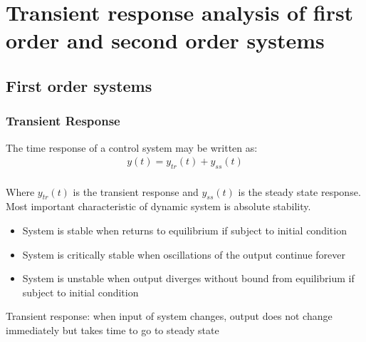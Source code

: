\section{Transient response analysis of first order and
second order systems}

\subsection{First order systems}

\begin{frame}
\frametitle{Transient Response}
The time response of a control system may be written as:
\begin{align*}
y(t) = y_{tr}(t) + y_{ss}(t)
\end {align*}
\\Where $y_{tr}(t)$ is the transient response and $y_{ss}(t)$ is the steady state response.
Most important characteristic of dynamic system is absolute stability.
\pause
\begin{itemize}
\item System is stable when returns to equilibrium if subject to initial condition
\item System is critically stable when oscillations of the output continue forever
\item System is unstable when output diverges without bound from equilibrium if subject to initial condition
\end{itemize}
\pause
Transient response: when input of system changes, output does not change immediately but takes time to go to steady state
\end{frame}

